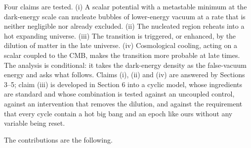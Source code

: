 \documentclass[11pt,a4paper]{article}
\begin{document}
Four claims are tested. (i) A scalar potential with a metastable minimum at the dark-energy scale can nucleate bubbles of lower-energy vacuum at a rate that is neither negligible nor already excluded. (ii) The nucleated region reheats into a hot expanding universe. (iii) The transition is triggered, or enhanced, by the dilution of matter in the late universe. (iv) Cosmological cooling, acting on a scalar coupled to the CMB, makes the transition more probable at late times. The analysis is conditional: it takes the dark-energy density as the false-vacuum energy and asks what follows. Claims (i), (ii) and (iv) are answered by Sections 3--5; claim (iii) is developed in Section 6 into a cyclic model, whose ingredients are standard and whose combination is tested against an uncoupled control, against an intervention that removes the dilution, and against the requirement that every cycle contain a hot big bang and an epoch like ours without any variable being reset.

The contributions are the following.
\end{document}
